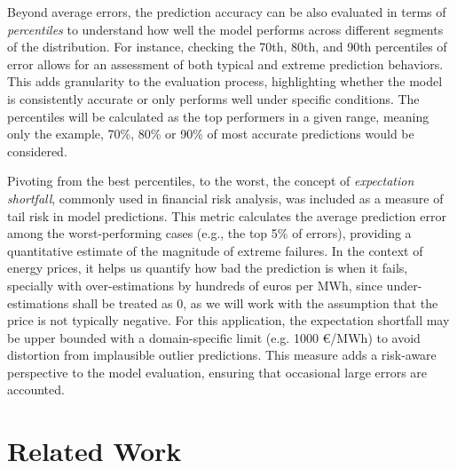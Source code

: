 \documentclass[12pt]{report} %
\begin{document}
Beyond average errors, the prediction accuracy can be also evaluated in terms of \textit{percentiles} to understand how well the model performs across different segments of the distribution. For instance, checking the 70th, 80th, and 90th percentiles of error allows for an assessment of both typical and extreme prediction behaviors. This adds granularity to the evaluation process, highlighting whether the model is consistently accurate or only performs well under specific conditions. The percentiles will be calculated as the top performers in a given range, meaning only the example, 70\%, 80\% or 90\% of most accurate predictions would be considered.

Pivoting from the best percentiles, to the worst, the concept of \textit{expectation shortfall}, commonly used in financial risk analysis, was included as a measure of tail risk in model predictions. This metric calculates the average prediction error among the worst-performing cases (e.g., the top 5\% of errors), providing a quantitative estimate of the magnitude of extreme failures. In the context of energy prices, it helps us quantify how bad the prediction is when it fails, specially with over-estimations by hundreds of euros per MWh, since under-estimations shall be treated as 0, as we will work with the assumption that the price is not typically negative. For this application, the expectation shortfall may be upper bounded with a domain-specific limit (e.g. 1000 €/MWh) to avoid distortion from implausible outlier predictions. This measure adds a risk-aware perspective to the model evaluation, ensuring that occasional large errors are accounted.

\section{Related Work}
\end{document}
